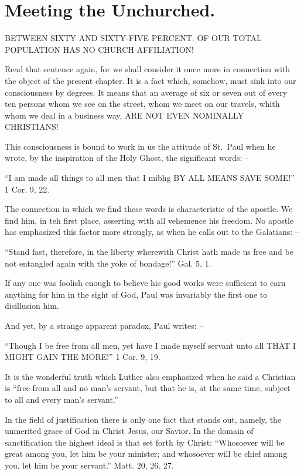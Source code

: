 \documentclass[
]{book}
\begin{document}
\hypertarget{meeting-the-unchurched.}{%
\section*{Meeting the Unchurched.}\label{meeting-the-unchurched.}}

BETWEEN SIXTY AND SIXTY-FIVE PERCENT. OF OUR TOTAL POPULATION HAS NO CHURCH AFFILIATION!

Read that sentence again, for we shall consider it once more in connection with the object of the present chapter. It is a fact which, somehow, must sink into our consciousness by degrees. It means that an average of six or seven out of every ten persons whom we see on the street, whom we meet on our travels, whith whom we deal in a business way, ARE NOT EVEN NOMINALLY CHRISTIANS!

This consciousness is bound to work in us the attitude of St.~Paul when he wrote, by the inspiration of the Holy Ghost, the significant words: --

``I am made all things to all men that I mibhg BY ALL MEANS SAVE SOME!'' 1 Cor. 9, 22.

The connection in which we find these words is characteristic of the apostle. We find him, in teh first place, asserting with all vehemence his freedom. No apostle has emphasized this factor more strongly, as when he calls out to the Galatians: --

``Stand fast, therefore, in the liberty wherewith Christ hath made us free and be not entangled again with the yoke of bondage!'' Gal. 5, 1.

If any one was foolish enough to believe his good works were sufficient to earn anything for him in the sight of God, Paul was invariably the first one to disillusion him.

And yet, by a strange apparent paradox, Paul writes: --

``Though I be free from all men, yet have I made myself servant unto all THAT I MIGHT GAIN THE MORE!'' 1 Cor. 9, 19.

It is the wonderful truth which Luther also emphasized when he said a Christian is ``free from all and no man's servant, but that he is, at the same time, subject to all and every man's servant.''

In the field of justification there is only one fact that stands out, namely, the unmerited grace of God in Christ Jesus, our Savior. In the domain of sanctification the highest ideal is that set forth by Christ: ``Whosoever will be great among you, let him be your minister; and whosoever will be chief among you, let him be your servant.'' Matt. 20, 26. 27.
\end{document}
